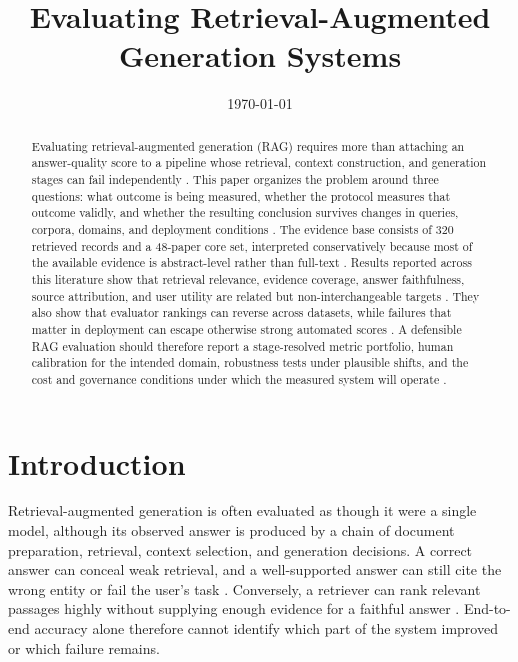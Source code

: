 \documentclass[a4paper,11pt]{article}
\title{Evaluating Retrieval-Augmented Generation Systems}
\author{}
\date{\today}
\begin{document}
\maketitle

\begin{abstract}


Evaluating retrieval-augmented generation (RAG) requires more than attaching an answer-quality score to a pipeline whose retrieval, context construction, and generation stages can fail independently \citep{Ding2026Attribution,Salemi2024Evaluating,Taiwo2026Evaluating}. This paper organizes the problem around three questions: what outcome is being measured, whether the protocol measures that outcome validly, and whether the resulting conclusion survives changes in queries, corpora, domains, and deployment conditions \citep{Caruzzo2026Deceptive,Murugaraj2025Ragvue,Muthyam2026Systems}. The evidence base consists of 320 retrieved records and a 48-paper core set, interpreted conservatively because most of the available evidence is abstract-level rather than full-text \citep{Sauc2026Multimodal,Miao2026Multi,Li2026Mrag}. Results reported across this literature show that retrieval relevance, evidence coverage, answer faithfulness, source attribution, and user utility are related but non-interchangeable targets \citep{Nematov2025Source,SaadFalcon2023Ares,Belinchon2026Effect}. They also show that evaluator rankings can reverse across datasets, while failures that matter in deployment can escape otherwise strong automated scores \citep{Ding2026Attribution,Caruzzo2026Deceptive}. A defensible RAG evaluation should therefore report a stage-resolved metric portfolio, human calibration for the intended domain, robustness tests under plausible shifts, and the cost and governance conditions under which the measured system will operate \citep{Brehme2025Retrieval,Cahoon2025Optimizing,Javadi2025Contradictions,Zhou2024Trustworthiness}.
\end{abstract}

\section{Introduction}


Retrieval-augmented generation is often evaluated as though it were a single model, although its observed answer is produced by a chain of document preparation, retrieval, context selection, and generation decisions. A correct answer can conceal weak retrieval, and a well-supported answer can still cite the wrong entity or fail the user's task \citep{Muthyam2026Systems,Caruzzo2026Deceptive}. Conversely, a retriever can rank relevant passages highly without supplying enough evidence for a faithful answer \citep{Taiwo2026Evaluating,Belinchon2026Effect}. End-to-end accuracy alone therefore cannot identify which part of the system improved or which failure remains.
\end{document}
